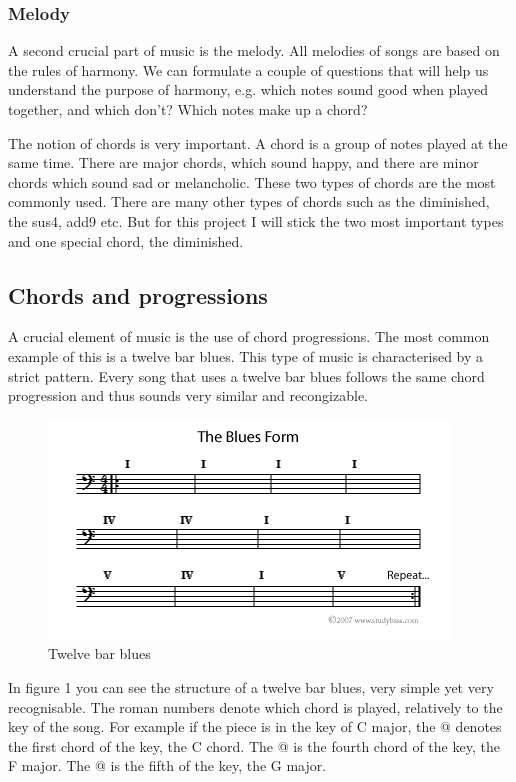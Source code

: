 \documentclass[12pt]{article}
\makeatletter
\newcommand*{\rom}[1]{\expandafter\@slowromancap\romannumeral #1@}
\makeatother
\begin{document}
\subsubsection{Melody}

A second crucial part of music is the melody. All melodies of songs are based on the rules of harmony. We can formulate a couple of questions that will help us understand the purpose of harmony, e.g. which notes sound good when played together, and which don't? Which notes make up a chord?
\newline

The notion of chords is very important. A chord is a group of notes played at the same time.
There are major chords, which sound happy, and there are minor chords which sound sad or melancholic. These two types of chords are the most commonly used. There are many other types of chords such as the diminished, the sus4, add9 etc. But for this project I will stick the two most important types and one special chord, the diminished.

\subsection{Chords and progressions}

A crucial element of music is the use of chord progressions. The most common example of this is a twelve bar blues. This type of music is characterised by a strict pattern. Every song that uses a twelve bar blues follows the same chord progression and thus sounds very similar and recongizable.

\begin{figure}[h]
\centering
\includegraphics[scale=0.8]{img/the-blues-form}
\caption{Twelve bar blues}
\end{figure}

In figure 1 you can see the structure of a twelve bar blues, very simple yet very recognisable. The roman numbers denote which chord is played, relatively to the key of the song. For example if the piece is in the key of C major, the \rom{1} denotes the first chord of the key, the C chord. The \rom{4} is the fourth chord of the key, the F major. The \rom{5} is the fifth of the key, the G major.
\newline
\end{document}

